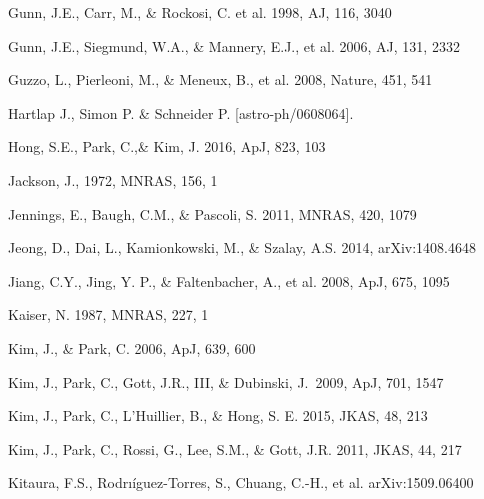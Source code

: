 \documentclass[iop]{emulateapj}
\begin{document}
\begin{thebibliography}{}




Gunn, J.E., Carr, M., \& Rockosi, C. et al. 1998, AJ, 116, 3040

Gunn, J.E., Siegmund, W.A., \& Mannery, E.J., et al. 2006, AJ, 131, 2332

Guzzo, L., Pierleoni, M., \& Meneux, B., et al. 2008, Nature, 451, 541

Hartlap J., Simon P. \& Schneider P. [astro-ph/0608064].


Hong, S.E., Park, C.,\&  Kim, J. 2016, ApJ, 823, 103

Jackson, J., 1972, MNRAS, 156, 1

Jennings, E., Baugh, C.M., \& Pascoli, S. 2011, MNRAS, 420, 1079  

Jeong, D., Dai, L., Kamionkowski, M., \& Szalay, A.S. 2014, arXiv:1408.4648

Jiang, C.Y., Jing, Y. P., \& Faltenbacher, A., et al. 2008, ApJ, 675, 1095

Kaiser, N. 1987, MNRAS, 227, 1


Kim, J., \& Park, C. 2006, ApJ, 639, 600  

Kim, J., Park, C., Gott, J.R., III, \& Dubinski, J.\ 2009, ApJ, 701, 1547 

Kim, J., Park, C., L'Huillier, B., \& Hong, S. E. 2015, JKAS, 48, 213

Kim, J., Park, C., Rossi, G., Lee, S.M., \& Gott, J.R. 2011, JKAS, 44, 217  

Kitaura, F.S., Rodrı\'{i}guez-Torres, S., Chuang, C.-H., et al. arXiv:1509.06400


\end{thebibliography}
\end{document}
